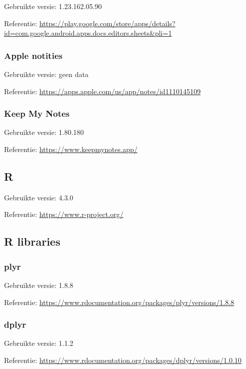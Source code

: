 \documentclass[
]{article}
\begin{document}
Gebruikte versie: 1.23.162.05.90

Referentie:
\url{https://play.google.com/store/apps/details?id=com.google.android.apps.docs.editors.sheets\&pli=1}

\hypertarget{a-notes}{%
\subsubsection{Apple notities}\label{a-notes}}

Gebruikte versie: geen data

Referentie: \url{https://apps.apple.com/us/app/notes/id1110145109}

\hypertarget{keep-my-notes}{%
\subsubsection{Keep My Notes}\label{keep-my-notes}}

Gebruikte versie: 1.80.180

Referentie: \url{https://www.keepmynotes.app/}

\hypertarget{r-lang}{%
\subsection{R}\label{r-lang}}

Gebruikte versie: 4.3.0

Referentie: \url{https://www.r-project.org/}

\hypertarget{r-libraries}{%
\subsection{R libraries}\label{r-libraries}}

\hypertarget{plyr}{%
\subsubsection{plyr}\label{plyr}}

Gebruikte versie: 1.8.8

Referentie:
\url{https://www.rdocumentation.org/packages/plyr/versions/1.8.8}

\hypertarget{dplyr}{%
\subsubsection{dplyr}\label{dplyr}}

Gebruikte versie: 1.1.2

Referentie:
\url{https://www.rdocumentation.org/packages/dplyr/versions/1.0.10}
\end{document}
